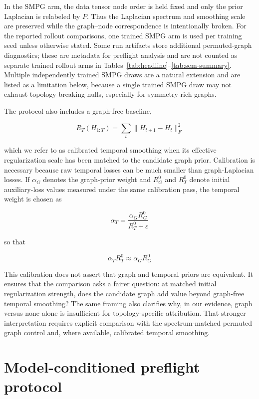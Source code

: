 \documentclass[preprint,12pt]{elsarticle}
\begin{document}
In the SMPG arm, the data tensor node order is held fixed and only the prior Laplacian is relabeled by \(P\). Thus the Laplacian spectrum and smoothing scale are preserved while the graph--node correspondence is intentionally broken. For the reported rollout comparisons, one trained SMPG arm is used per training seed unless otherwise stated. Some run artifacts store additional permuted-graph diagnostics; these are metadata for preflight analysis and are not counted as separate trained rollout arms in Tables~\ref{tab:headline}--\ref{tab:sem-summary}. Multiple independently trained SMPG draws are a natural extension and are listed as a limitation below, because a single trained SMPG draw may not exhaust topology-breaking nulls, especially for symmetry-rich graphs.

The protocol also includes a graph-free baseline,

\begin{equation}
R_T(H_{1:T})=\sum_t \lVert H_{t+1}-H_t \rVert_F^2
\end{equation}

which we refer to as calibrated temporal smoothing when its effective regularization scale has been matched to the candidate graph prior. Calibration is necessary because raw temporal losses can be much smaller than graph-Laplacian losses. If $\alpha_G$ denotes the graph-prior weight and $R_G^0$ and $R_T^0$ denote initial auxiliary-loss values measured under the same calibration pass, the temporal weight is chosen as

\begin{equation}
\alpha_T = \frac{\alpha_G R_G^0}{R_T^0+\varepsilon}
\end{equation}

so that

\begin{equation}
\alpha_T R_T^0 \approx \alpha_G R_G^0
\end{equation}

This calibration does not assert that graph and temporal priors are equivalent. It ensures that the comparison asks a fairer question: at matched initial regularization strength, does the candidate graph add value beyond graph-free temporal smoothing? The same framing also clarifies why, in our evidence, graph versus none alone is insufficient for topology-specific attribution. That stronger interpretation requires explicit comparison with the spectrum-matched permuted graph control and, where available, calibrated temporal smoothing.

\section{Model-conditioned preflight protocol}
\label{sec:protocol}
\end{document}
